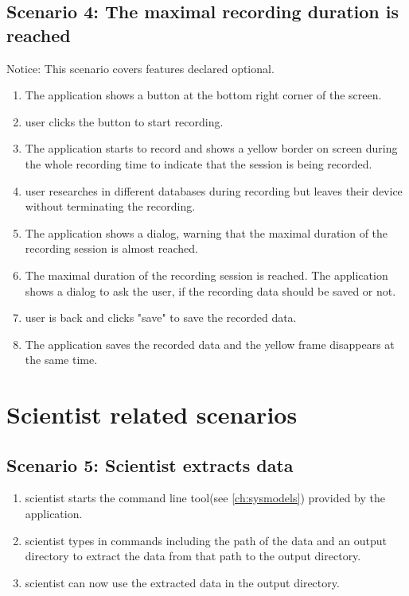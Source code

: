 \subsection{Scenario 4: The maximal recording duration is reached}
Notice: This scenario covers features declared optional.
\begin{enumerate}
    \item The application shows a button at the bottom right corner of the screen.
    \item \Gls{user} clicks the button to start recording.
    \item The application starts to record and shows a yellow border on screen during the whole recording time to indicate that the \gls{session} is being recorded.
    \item \Gls{user} researches in different databases during recording but leaves their \gls{device} without terminating the recording.
    \item The application shows a dialog, warning that the maximal duration of the recording \gls{session} \see[OC10] is almost reached.
    \item The maximal duration of the recording \gls{session} \see[OC10] is reached. The application shows a dialog to ask the \gls{user}, if the recording data should be saved or not.
    \item \Gls{user} is back and clicks "save" to save the recorded data.
    \item The application saves the recorded data and the yellow frame disappears at the same time.
\end{enumerate}

\section{Scientist related scenarios}
\subsection{Scenario 5: Scientist extracts data}
\begin{enumerate}
    \item \Gls{scientist} starts the command line tool(see \autoref{ch:sysmodels}) provided by the application.
    \item \Gls{scientist} types in commands including the path of the data and an output directory to extract the data from that path to the output directory.
    \item \Gls{scientist} can now use the extracted data in the output directory.
\end{enumerate}


